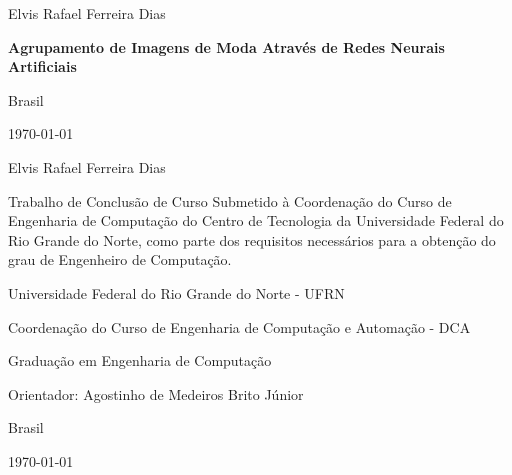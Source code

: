 \documentclass[12pt]{report}
\def\worktitle{Agrupamento de Imagens de Moda Através de Redes Neurais Artificiais}
\def\workauthor{Elvis Rafael Ferreira Dias}
\begin{document}
\begin{titlepage}

	\centering
	{\normalsize \workauthor \par}
	\vfill
	{\Large\bfseries \worktitle \par}
	\vfill


	{\normalsize Brasil\par}
	{\normalsize \monthyeardate\today}
\end{titlepage}

\begin{titlepage}

	\centering
	{\normalsize \workauthor\par}
	\vfill
	\centering
	{\Large\bfseries \par}
	\vfill

	\begin{flushright}	
	\begin{minipage}{15em}	
  	Trabalho de Conclusão de Curso Submetido à Coordenação do Curso de Engenharia de Computação do Centro de Tecnologia da Universidade Federal do Rio Grande do Norte, como parte dos requisitos necessários para a obtenção do grau de Engenheiro de Computação.
	\end{minipage}
	\end{flushright}	
	\vfill
	
	
	{\small Universidade Federal do Rio Grande do Norte - UFRN \par}
	{\small Coordenação do Curso de Engenharia de Computação e Automação - DCA \par}
	{\small Graduação em Engenharia de Computação \par}
	\vfill
	\normalsize
	\centering
	{\normalsize Orientador: Agostinho de Medeiros Brito Júnior \par}
	\vfill
	{\normalsize Brasil\par}
	{\normalsize \monthyeardate\today}
\end{titlepage}
\end{document}
